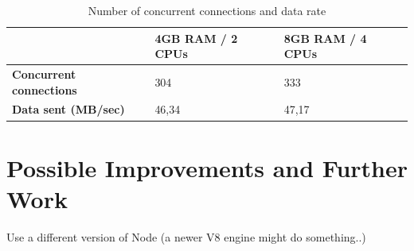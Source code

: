 \begin{table}[h!]
\centering
\begin{tabular}{lll}
\hline
	& \textbf{4GB RAM / 2 CPUs}	&	\textbf{8GB RAM / 4 CPUs} \\ \hline
\textbf{Concurrent connections}	& 304	& 333 \\
\textbf{Data sent (MB/sec)}	& 46,34	& 47,17 \\
\hline                         
\end{tabular}
\caption{Number of concurrent connections and data rate}
\label{table:connectionsDatarate}
\end{table}



\section{Possible Improvements and Further Work}

Use a different version of Node (a newer V8 engine might do something..)



